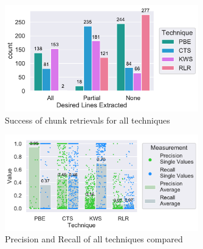 \documentclass[\myrootdir/main.tex]{subfiles}
\begin{document}


\begin{figure}[htbp]
		\centering
		\includegraphics[width=0.75\textwidth, clip]{img/big-study/success-partial-all.pdf}
		\caption{Success of chunk retrievals for all techniques}
		\label{fig:success-partial-all}
\end{figure}


\begin{figure}[htbp]
		\centering
		\includegraphics[width=0.75\textwidth, clip]{img/big-study/recall-precision-all.pdf}
		\caption{Precision and Recall of all techniques compared}
		\label{fig:recall-precision-all}
\end{figure}
\end{document}
